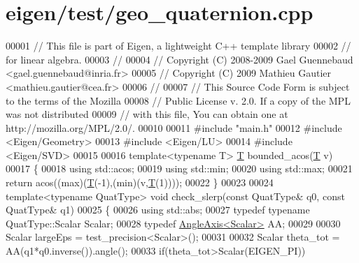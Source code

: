 \hypertarget{eigen_2test_2geo__quaternion_8cpp_source}{}\section{eigen/test/geo\+\_\+quaternion.cpp}
\label{eigen_2test_2geo__quaternion_8cpp_source}

\begin{DoxyCode}
00001 \textcolor{comment}{// This file is part of Eigen, a lightweight C++ template library}
00002 \textcolor{comment}{// for linear algebra.}
00003 \textcolor{comment}{//}
00004 \textcolor{comment}{// Copyright (C) 2008-2009 Gael Guennebaud <gael.guennebaud@inria.fr>}
00005 \textcolor{comment}{// Copyright (C) 2009 Mathieu Gautier <mathieu.gautier@cea.fr>}
00006 \textcolor{comment}{//}
00007 \textcolor{comment}{// This Source Code Form is subject to the terms of the Mozilla}
00008 \textcolor{comment}{// Public License v. 2.0. If a copy of the MPL was not distributed}
00009 \textcolor{comment}{// with this file, You can obtain one at http://mozilla.org/MPL/2.0/.}
00010 
00011 \textcolor{preprocessor}{#include "main.h"}
00012 \textcolor{preprocessor}{#include <Eigen/Geometry>}
00013 \textcolor{preprocessor}{#include <Eigen/LU>}
00014 \textcolor{preprocessor}{#include <Eigen/SVD>}
00015 
00016 \textcolor{keyword}{template}<\textcolor{keyword}{typename} T> \hyperlink{group___sparse_core___module_class_eigen_1_1_triplet}{T} bounded\_acos(\hyperlink{group___sparse_core___module_class_eigen_1_1_triplet}{T} v)
00017 \{
00018   \textcolor{keyword}{using} std::acos;
00019   \textcolor{keyword}{using} std::min;
00020   \textcolor{keyword}{using} std::max;
00021   \textcolor{keywordflow}{return} acos((max)(\hyperlink{group___sparse_core___module_class_eigen_1_1_triplet}{T}(-1),(min)(v,\hyperlink{group___sparse_core___module_class_eigen_1_1_triplet}{T}(1))));
00022 \}
00023 
00024 \textcolor{keyword}{template}<\textcolor{keyword}{typename} QuatType> \textcolor{keywordtype}{void} check\_slerp(\textcolor{keyword}{const} QuatType& q0, \textcolor{keyword}{const} QuatType& q1)
00025 \{
00026   \textcolor{keyword}{using} std::abs;
00027   \textcolor{keyword}{typedef} \textcolor{keyword}{typename} QuatType::Scalar Scalar;
00028   \textcolor{keyword}{typedef} \hyperlink{group___geometry___module_class_eigen_1_1_angle_axis}{AngleAxis<Scalar>} AA;
00029 
00030   Scalar largeEps = test\_precision<Scalar>();
00031 
00032   Scalar theta\_tot = AA(q1*q0.inverse()).angle();
00033   \textcolor{keywordflow}{if}(theta\_tot>Scalar(EIGEN\_PI))

\end{DoxyCode}
